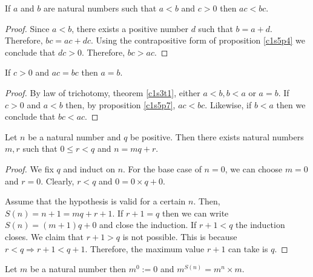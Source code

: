 \begin{prop}\label{c1s5p7}
If $a$ and $b$ are natural numbers such that $a < b$ and $c > 0$ then
$ac < bc$.
\end{prop}
\begin{proof}
Since $a < b$, there exists a positive number $d$ such that $b = a + d$.
Therefore, $bc = ac + dc$. Using the contrapositive form of proposition
\ref{c1s5p4} we conclude that $dc > 0$. Therefore, $bc > ac$.
\end{proof}

\begin{prop}\label{c1s5p8}
If $c > 0$ and $ac = bc$ then $a = b$.
\end{prop}
\begin{proof}
By law of trichotomy, theorem \ref{c1s3t1}, either $a < b, b < a$ or $a = 
b$. If $c > 0$ and $a < b$ then, by proposition \ref{c1s5p7}, $ac < bc$.
Likewise, if $b < a$ then we conclude that $bc < ac$. 
\end{proof}

\begin{prop}\label{c1s5p9}
Let $n$ be a natural number and $q$ be positive. Then there exists natural
numbers $m, r$ such that $0 \le r < q$ and $n = mq + r$.
\end{prop}
\begin{proof}
We fix $q$ and induct on $n$. For the base case of $n = 0$, we can choose
$m = 0$ and $r = 0$. Clearly, $r < q$ and $0 = 0 \times q + 0$.

Assume that the hypothesis is valid for a certain $n$. Then, $S(n) = n + 1
= mq + r + 1$. If $r + 1 = q$ then we can write $S(n) = (m + 1)q + 0$ and
close the induction. If $r + 1 < q$ the induction closes. We claim that
$r + 1 > q$ is not possible. This is because $r < q \Rightarrow r + 1 < q + 
1$. Therefore, the maximum value $r + 1$ can take is $q$.
\end{proof}

\begin{defn}\label{c1s5d2}
Let $m$ be a natural number then $m^0 := 0$ and $m^{S(n)} = m^n \times m$.
\end{defn}
